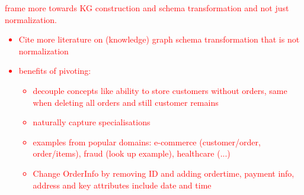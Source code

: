 \documentclass[sigconf]{acmart}
\begin{document}
\textcolor{red}{frame more towards KG construction and schema transformation and not just normalization.
\begin{itemize}
    \item Cite more literature on (knowledge) graph schema transformation that is not normalization
    \item benefits of pivoting:
    \begin{itemize}
        \item decouple concepts like ability to store customers without orders, same when deleting all orders and still customer remains
        \item naturally capture specialisations
        \item examples from popular domains: e-commerce (customer/order, order/items), fraud (look up example), healthcare (...)
        \item Change OrderInfo by removing ID and adding ordertime, payment info, address and key attributes include date and time
    \end{itemize}
\end{itemize}
}
\end{document}
